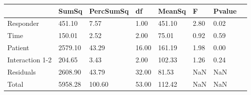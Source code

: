 \begin{tabular}{llllllll}
 & SumSq & PercSumSq & df & MeanSq & F & Pvalue \\ 
 \hline 
Responder & 451.10 & 7.57 & 1.00 & 451.10 & 2.80 & 0.02 \\ 
Time & 150.01 & 2.52 & 2.00 & 75.01 & 0.92 & 0.59 \\ 
Patient & 2579.10 & 43.29 & 16.00 & 161.19 & 1.98 & 0.00 \\ 
Interaction 1-2 & 204.65 & 3.43 & 2.00 & 102.33 & 1.26 & 0.24 \\ 
Residuals & 2608.90 & 43.79 & 32.00 & 81.53 & NaN & NaN \\ 
Total & 5958.28 & 100.60 & 53.00 & 112.42 & NaN & NaN \\ 
\end{tabular} 
